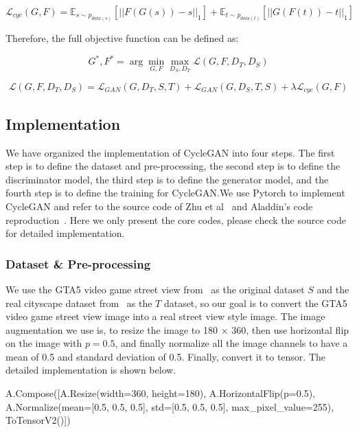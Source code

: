 \begin{equation}
    \mathcal{L}_{cyc}(G,F) = \mathbb{E}_{s \sim p_{data(s)}}[||F(G(s)) - s||_{1}] + \mathbb{E}_{t \sim p_{data(t)}}[||G(F(t)) - t||_{1}]
\end{equation}

Therefore, the full objective function can be defined as:

\begin{equation}
    G^*,F^* = \arg \mathop{\min}_{G,F} \mathop{\max}_{D_S,D_T} \mathcal{L}(G,F,D_T,D_S)
\end{equation}

\begin{equation}
    \mathcal{L}(G,F,D_T,D_S) = \mathcal{L}_{GAN}(G,D_T,S,T) + \mathcal{L}_{GAN}(G,D_S,T,S) + \lambda \mathcal{L}_{cyc}(G,F)
\end{equation}

\subsection{Implementation}
We have organized the implementation of CycleGAN into four steps. The first step is to define the dataset and pre-processing, the second step is to define the discriminator model, the third step is to define the generator model, and the fourth step is to define the training for CycleGAN.\@ We use Pytorch to implement CycleGAN and refer to the source code of Zhu et al~\cite{zhu2017unpaired} and Aladdin's code reproduction~\cite{CycleGANcode}. Here we only present the core codes, please check the source code for detailed implementation.

\subsubsection{Dataset \& Pre-processing}
We use the GTA5 video game street view from~\cite{richter2016playing} as the original dataset $S$ and the real cityscape dataset from~\cite{cordts2016cityscapes} as the $T$ dataset, so our goal is to convert the GTA5 video game street view image into a real street view style image. The image augmentation we use is, to resize the image to 180 $\times$ 360, then use horizontal flip on the image with $p = 0.5$, and finally normalize all the image channels to have a mean of 0.5 and standard deviation of 0.5. Finally, convert it to tensor. The detailed implementation is shown below.

\begin{python}
A.Compose([A.Resize(width=360, height=180),
                    A.HorizontalFlip(p=0.5),
                    A.Normalize(mean=[0.5, 0.5, 0.5],
                                std=[0.5, 0.5, 0.5], 
                                max_pixel_value=255),
                    ToTensorV2()])
\end{python}

